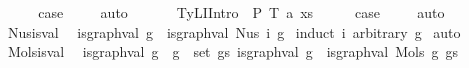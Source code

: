 \begin{isabellebody}
\ \ \isamarkupfalse%
\ \isamarkupfalse%
\ {\isacharquery}{\kern0pt}case\ \isanewline
\ \ \isamarkupfalse%
\ auto\isanewline
\ \ \isamarkupfalse%
\isanewline
{}\isamarkupfalse%
\isanewline
\ \ \isamarkupfalse%
\ {\isacharparenleft}{\kern0pt}TyLIIntro{}\ {\isasymGamma}\ P\ T\ a\ xs{\isacharparenright}{\kern0pt}\isanewline
\ \ \isamarkupfalse%
\ \isamarkupfalse%
\ {\isacharquery}{\kern0pt}case\ \isanewline
\ \ \isamarkupfalse%
\ auto\isanewline
\ \ \isamarkupfalse%
\isanewline
{}\isamarkupfalse%
%
\endisatagproof
{\isafoldproof}%
%
\isadelimproof
%
\endisadelimproof
%
\isadelimdocument
%
\endisadelimdocument
%
\isatagdocument
%
\isamarkuptrue%
%
\endisatagdocument
{\isafolddocument}%
%
\isadelimdocument
%
\endisadelimdocument
{}\isamarkupfalse%
\ Nus{\isacharunderscore}{\kern0pt}is{\isacharunderscore}{\kern0pt}val{\isacharcolon}{\kern0pt}\isanewline
\ \ {\isachardoublequoteopen}is{\isacharunderscore}{\kern0pt}graph{\isacharunderscore}{\kern0pt}val\ g\ {\isacharequal}{\kern0pt}\ is{\isacharunderscore}{\kern0pt}graph{\isacharunderscore}{\kern0pt}val\ {\isacharparenleft}{\kern0pt}Nus{}\ i\ g{\isacharparenright}{\kern0pt}{\isachardoublequoteclose}\isanewline
%
\isadelimproof
%
\endisadelimproof
%
\isatagproof
{}\isamarkupfalse%
\ {\isacharparenleft}{\kern0pt}induct\ i\ arbitrary{\isacharcolon}{\kern0pt}\ g{\isacharparenright}{\kern0pt}\isanewline
{}\isamarkupfalse%
\ auto%
\endisatagproof
{\isafoldproof}%
%
\isadelimproof
\isanewline
%
\endisadelimproof
\isanewline
\isanewline
{}\isamarkupfalse%
\ Mols{}{\isacharunderscore}{\kern0pt}is{\isacharunderscore}{\kern0pt}val{\isacharcolon}{\kern0pt}\isanewline
\ \ {\isachardoublequoteopen}{\isacharparenleft}{\kern0pt}is{\isacharunderscore}{\kern0pt}graph{\isacharunderscore}{\kern0pt}val\ g\ {\isasymand}\ {\isacharparenleft}{\kern0pt}{\isasymforall}g\ {\isasymin}\ set\ gs{\isachardot}{\kern0pt}\ is{\isacharunderscore}{\kern0pt}graph{\isacharunderscore}{\kern0pt}val\ g{\isacharparenright}{\kern0pt}{\isacharparenright}{\kern0pt}\ {\isacharequal}{\kern0pt}\ is{\isacharunderscore}{\kern0pt}graph{\isacharunderscore}{\kern0pt}val\ {\isacharparenleft}{\kern0pt}Mols{}\ g\ gs{\isacharparenright}{\kern0pt}{\isachardoublequoteclose}\isanewline
%
\isadelimproof

\end{isabellebody}

